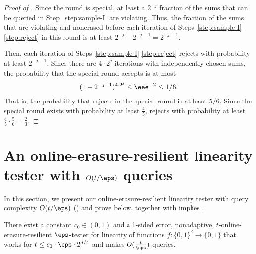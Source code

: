 \documentclass{toc}
\begin{document}
\begin{proof}[Proof of ]
Since the round is special, at least a $2^{-j}$ fraction of the sums that can be queried in Step~\ref{step:sample-I} are violating.
Thus,
the fraction of the sums that are violating and nonerased before each iteration of Steps~\ref{step:sample-I}-\ref{step:reject} in this round is at least $2^{-j}-2^{-j-1}=2^{-j-1}.$

Then, each iteration of Steps~\ref{step:sample-I}-\ref{step:reject} rejects with probability at least $2^{-j-1}.$ Since there are $4\cdot 2^j$ iterations with independently chosen sums, the probability that the special round accepts is at most 
\begin{align*}
(1-2^{-j-1})^{4 \cdot 2^j} \leq \eee^{-2}\leq  1/ 6.
\end{align*}
That is, the probability that  rejects in the special round is at least $5/6$. Since the special round exists with probability at least $\frac{4}{5}$,  rejects with probability at least $\frac{4}{5}\cdot \frac{5}{6} = \frac{2}{3}$. 
\end{proof}



%
%
\section{An online-erasure-resilient linearity tester with $O(t/\eps)$ queries} \label{sec:linearity_appendix}


%
%
In this section, we present our online-erasure-resilient linearity tester with query complexity $O(t/\eps)$ () and prove   below.  together with  implies . 

\begin{theorem}\label{thm:linearity}
There exist a constant $c_0 \in (0,1)$ and a 1-sided error, nonadaptive, $t$-online-erasure-resilient $\eps$-tester for linearity of functions $f\colon \{0,1\}^d \to \{0,1\}$ that  works for $t \leq c_0\cdot\eps \cdot  2^{d/4}$ and makes $O(\frac{t}{\eps})$ queries.
\end{theorem}
\end{document}
